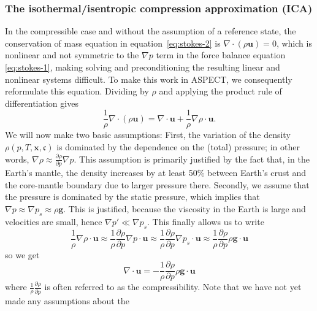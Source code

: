 \documentclass{article}
\newcommand{\aspect}{\textsc{ASPECT}}
\begin{document}
\subsubsection{The isothermal/isentropic compression approximation (ICA)}
\label{sec:ica}

In the compressible case and without the assumption of a reference state,
the conservation of mass equation in equation~\eqref{eq:stokes-2} is $\nabla
\cdot \left( \rho \textbf{u} \right)= 0$, which is nonlinear and not symmetric to the $\nabla p$ term in the
force balance equation \eqref{eq:stokes-1}, making solving and preconditioning
the resulting linear and nonlinear systems difficult. To make this work in
\aspect{}, we consequently reformulate this equation. Dividing by $\rho$ and
applying the product rule of differentiation gives
\begin{equation*}
\frac{1}{\rho} \nabla \cdot \left( \rho \textbf{u} \right) = \nabla \cdot \textbf{u} + \frac{1}{\rho} \nabla \rho \cdot  \textbf{u}.
\end{equation*}
We will now make two basic assumptions: First, the variation of the density
$\rho(p,T,\mathbf x, \mathfrak c)$ is dominated by the dependence on the
(total) pressure; in other words, $\nabla \rho \approx \frac{\partial \rho}{\partial
  p}\nabla p$. This assumption is primarily justified by the fact that, in the
Earth's mantle, the density increases by at least 50\% between Earth's crust and
the core-mantle boundary due to larger pressure there. Secondly, we assume
that the pressure is dominated by the static pressure, which implies that
$\nabla p \approx \nabla p_s \approx \rho \textbf{g}$. This is justified,
because the viscosity in the Earth is large and velocities are small,
hence $\nabla p' \ll \nabla p_s$.
This finally allows us to write
\begin{equation*}
\frac{1}{\rho} \nabla \rho \cdot \textbf{u} \approx \frac{1}{\rho} \frac{\partial \rho}{\partial p} \nabla p \cdot \textbf{u} \approx \frac{1}{\rho} \frac{\partial \rho}{\partial p} \nabla p_s \cdot \textbf{u} \approx \frac{1}{\rho} \frac{\partial \rho}{\partial p} \rho \textbf{g} \cdot \textbf{u}
\end{equation*}
so we get
\begin{equation}
\label{eq:stokes-2-compressible}
\nabla \cdot \textbf{u} = - \frac{1}{\rho} \frac{\partial \rho}{\partial p} \rho \textbf{g} \cdot \textbf{u}
\end{equation}
where $\frac{1}{\rho} \frac{\partial \rho}{\partial p}$ is often referred to
as the compressibility. Note that we have not yet made any assumptions about the
\end{document}
